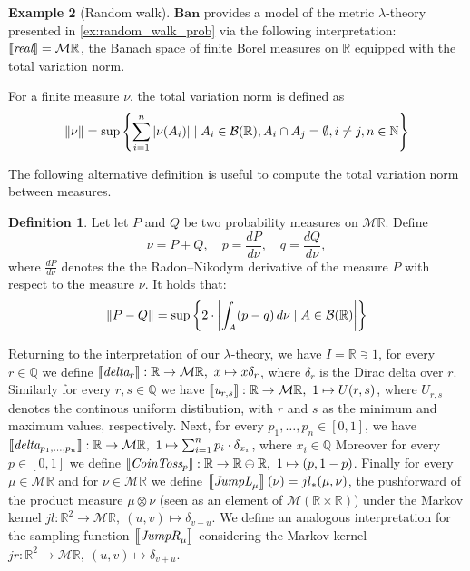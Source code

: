 \documentclass[10pt,a4paper]{amsart}
\theoremstyle{definition}
\newtheorem{definition}{Definition}[section]
\theoremstyle{definition}
\newtheorem{example}[definition]{Example}
\theoremstyle{definition}
\theoremstyle{definition}
\theoremstyle{definition}
\theoremstyle{definition}
\begin{document}
  \begin{example}[Random walk]

    $\mathbf{Ban}$ provides a model of the metric $\lambda$-theory presented in \ref{ex:random_walk_prob}  via the following interpretation: $\left \llbracket \emph{real} \right \rrbracket = \mathcal{M}\mathbb{R}$, the Banach space of finite Borel measures on $\mathbb{R}$ equipped with the total  variation norm.

    For a finite measure $\nu$, the total variation norm is defined as
    \begin{align*}
      \left\lVert \nu \right\rVert = \sup \left\{ \sum_{i=1}^n |\nu(A_i)| \mid A_i \in \mathcal{B}(\mathbb{R}), A_i \cap A_j = \emptyset, i \neq j, n \in \mathbb{N} \right\}
    \end{align*}



    The following alternative definition is useful to compute the total variation norm between measures.

  \begin{definition} \cite{tsybakov2008}
    Let  let $P$ and $Q$ be two probability measures on $\mathcal{M}\mathbb{R}$. Define
    $$
      \nu = P + Q, \quad p = \frac{dP}{d\nu}, \quad q = \frac{dQ}{d\nu},
    $$
    where $\frac{dP}{d\nu}$ denotes the  the Radon–Nikodym derivative of the measure $P$ with respect to the measure $\nu$. It holds that:
    \begin{align*}
      \left\lVert P-Q \right\rVert = \sup \left\{ 2 \cdot \left\vert \int_{A} (p - q) \, d\nu \mid A \in  \mathcal{B}(\mathbb{R}) \right\vert \right\}
    \end{align*}
  \end{definition}
  
    Returning to the interpretation of our $\lambda$-theory, 
    we have $I = \mathbb{R} \ni 1$, 
    for every $r \in \mathbb{Q}$ we define $\left \llbracket \emph{delta}_r \right \rrbracket:\mathbb{R} \to \mathcal{M}\mathbb{R},\ x \mapsto x\delta_r$, where $\delta_r$ is the Dirac delta over $r$. 
    Similarly for every $r,s \in \mathbb{Q}$ we have $\left \llbracket \emph{u}_{r,s} \right \rrbracket:\mathbb{R} \to \mathcal{M}\mathbb{R},\ 1 \mapsto U(r,s) $, where $U_{r,s}$ denotes the continous uniform distibution, with $r$ and $s$ as the minimum and maximum values, respectively. 
    Next,  for every $p_1,\ldots,p_n \in [0,1]$, we have $\left \llbracket \emph{delta}_{p_1,\ldots,p_n} \right \rrbracket:\mathbb{R} \to \mathcal{M}\mathbb{R},\ 1 \mapsto \sum_{i=1}^n p_i\cdot \delta_{x_i}$, where $x_i \in \mathbb{Q}$
    Moreover  for every $p \in [0,1]$ we define $\left \llbracket \emph{CoinToss}_p \right \rrbracket:\mathbb{R} \to \mathbb{R} \oplus \mathbb{R},\ 1 \mapsto (p, 1-p)$. 
    Finally for every $\mu \in \mathcal{M}\mathbb{R}$ and for $\nu  \in \mathcal{M}\mathbb{R}$ we define $\left \llbracket \emph{JumpL}_\mu \right \rrbracket (\nu) = jl_{*}(\mu,\nu) $, the pushforward of the product measure $\mu \otimes \nu$ (seen as an element of $\mathcal{M}(\mathbb{R} \times \mathbb{R})$) under the Markov kernel $jl: \mathbb{R}^2 \to \mathcal{M}\mathbb{R},\ (u,v) \mapsto \delta_{v-u}$.  We define an analogous interpretation for the sampling function $\left \llbracket \emph{JumpR}_\mu \right \rrbracket$ considering the Markov kernel $jr: \mathbb{R}^2 \to \mathcal{M}\mathbb{R},\ (u,v) \mapsto \delta_{v+u}$.


\end{example}
\end{document}
